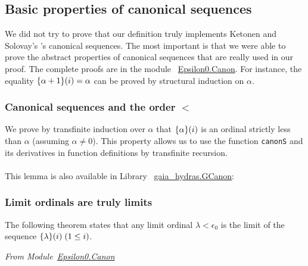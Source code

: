 \subsection{Basic properties of canonical sequences}

We did not  try to prove that our definition truly implements Ketonen and Solovay's  \cite{KS81}'s canonical sequences. The most important is that we were able to prove the 
abstract properties  of canonical sequences that are really used in our proof. The complete proofs are in the module
~\href{../theories/html/hydras.Epsilon0.Canon.html}{Epsilon0.Canon}.
For instance, the equality $\mbox{$\{\alpha+1\}(i)$}=\alpha$  can be  proved by  structural induction on $\alpha$.




\subsubsection{Canonical sequences and the order $<$}


We prove by transfinite induction over $\alpha$ that $\mbox{$\{\alpha\}(i)$}$ is an ordinal strictly less than $\alpha$ (assuming $\alpha\not=0$). This property allows us to use the function \texttt{canonS} and its derivatives in function definitions by transfinite recursion.

\label{lemma:canon_LT}


\paragraph*{\gaiasign} This lemma is also available in
Library ~\href{../theories/html/gaia_hydras.GCanon.html}{gaia\_hydras.GCanon}:



\subsubsection{Limit ordinals are truly limits}
The following theorem states that any limit ordinal $\lambda<\epsilon_0$ 
is the limit of the sequence $\mbox{$\{\lambda\}(i)$}\;(1\le i)$.


\vspace{4pt}

\emph{From Module~\href{../theories/html/hydras.Epsilon0.Canon.html\#canonS_limit_strong}{Epsilon0.Canon}}

